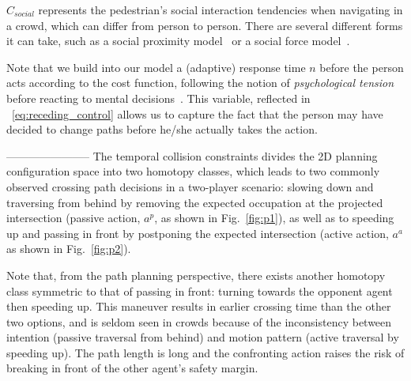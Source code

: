 \documentclass[conference]{IEEEtran}
\begin{document}
$C_{social}$ represents the pedestrian's social interaction tendencies when navigating in a crowd, which can differ from person to 
person.  There are several different forms it can take, such as a social 
proximity model~\cite{kruse2012legible} or a social force 
model~\cite{helbing1995social}.

Note that we build into our model a (adaptive) response 
time $n$ before the person acts according to the cost function, following the notion of
\emph{psychological tension} before reacting to mental 
decisions~\cite{helbing1995social}.  This variable, reflected in 
~\ref{eq:receding_control} allows us to capture the fact that the person may 
have decided to change paths before he/she actually takes the action.

-----------------------
The temporal collision constraints
divides the 2D planning configuration space into two 
homotopy classes,
which leads to two commonly observed crossing path decisions 
in a two-player scenario: slowing down and traversing from behind by 
removing the expected occupation
 at the projected intersection
(passive action, $a^{p}$, as 
shown in Fig.~\ref{fig:p1}), as well as to speeding up and passing in front by postponing 
the expected intersection (active action, $a^a$ as shown in Fig.~\ref{fig:p2}).

Note that, from the path planning perspective, there exists another homotopy 
class symmetric to that of passing in front:  turning towards the 
opponent agent then speeding up. 
This maneuver results in earlier crossing time
than the other two options, and 
is seldom seen in crowds because of the inconsistency between intention 
(passive traversal from behind) and motion pattern (active traversal by 
speeding up). The path length is long and the confronting action raises the 
risk of breaking in front of the other agent's safety margin. 
\vspace{-.2em}
\end{document}
